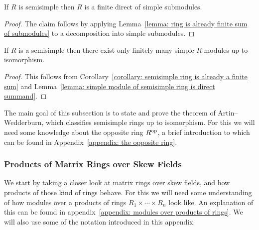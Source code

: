 \begin{corollary}
  \label{corollary: semisimple ring is already a finite sum}
  If $R$ is semisimple then $R$ is a finite direct of simple submodules.
\end{corollary}


\begin{proof}
 The claim follows by applying Lemma~\ref{lemma: ring is already finite sum of submodules} to a decomposition into simple submodules.
\end{proof}


\begin{corollary}
  \label{corollary: ss rings have only finitely many simple modules}
  If $R$ is a semisimple then there exist only finitely many simple $R$ modules up to isomorphism.
\end{corollary}


\begin{proof}
  This follows from Corollary~\ref{corollary: semisimple ring is already a finite sum} and Lemma~\ref{lemma: simple module of semisimple ring is direct summand}.
\end{proof}


\begin{fluff}
  The main goal of this subsection is to state and prove the theorem of Artin--Wedderburn, which classifies semisimple rings up to isomorphism.
  For this we will need some knowledge about the opposite ring $R^{\mathrm{op}}$, a brief introduction to which can be found in Appendix~\ref{appendix: the opposite ring}.
\end{fluff}





\subsubsection{Products of Matrix Rings over Skew Fields}


\begin{fluff}
  We start by taking a closer look at matrix rings over skew fields, and how products of those kind of rings behave.
  For this we will need some understanding of how modules over a products of rings $R_1 \times \dotsb \times R_n$ look like.
  An explanation of this can be found in appendix~\ref{appendix: modules over products of rings}.
  We will also use some of the notation introduced in this appendix.
\end{fluff}


